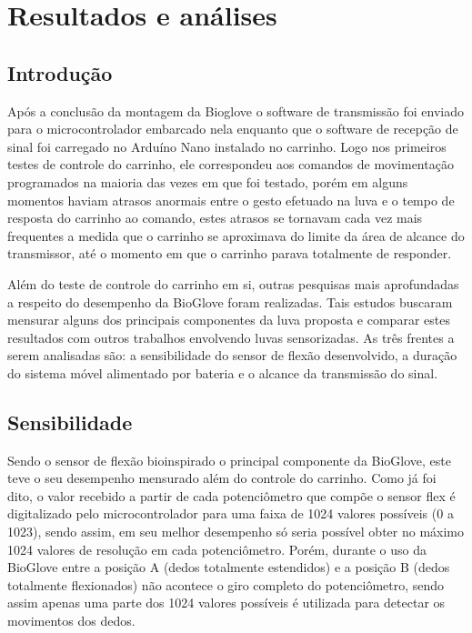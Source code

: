 \documentclass[
	12pt,				%
	openright,			%
	oneside,			%
	a4paper,			%
	english,			%
	brazil				%
	]{abntex2}
\begin{document}


\chapter{Resultados e análises}

		\section{Introdução}
		
		Após a conclusão da montagem da Bioglove o software de transmissão foi enviado para o microcontrolador embarcado nela enquanto que o software de recepção de sinal foi carregado no Arduíno Nano instalado no carrinho. Logo nos primeiros testes de controle do carrinho, ele correspondeu aos comandos de movimentação programados na maioria das vezes em que foi testado, porém em alguns momentos haviam atrasos anormais entre o gesto efetuado na luva e o tempo de resposta do carrinho ao comando, estes atrasos se tornavam cada vez mais frequentes a medida que o carrinho se aproximava do limite da área de alcance do transmissor, até o momento em que o carrinho parava totalmente de responder.

		Além do teste de controle do carrinho em si, outras pesquisas mais aprofundadas a respeito do desempenho da BioGlove foram realizadas. Tais estudos buscaram mensurar alguns dos principais componentes da luva proposta e comparar estes resultados com outros trabalhos envolvendo luvas sensorizadas. As três frentes a serem analisadas são: a sensibilidade do sensor de flexão desenvolvido, a duração do sistema móvel alimentado por bateria e o alcance da transmissão do sinal.
		

		\section{Sensibilidade}

		Sendo o sensor de flexão bioinspirado o principal componente da BioGlove, este teve o seu desempenho mensurado além do controle do carrinho. Como já foi dito, o valor recebido a partir de cada potenciômetro que compõe o sensor flex é digitalizado pelo microcontrolador para uma faixa de 1024 valores possíveis (0 a 1023), sendo assim, em seu melhor desempenho só seria possível obter no máximo 1024 valores de resolução em cada potenciômetro. Porém, durante o uso da BioGlove entre a posição A (dedos totalmente estendidos) e a posição B (dedos totalmente flexionados) não acontece o giro completo do potenciômetro, sendo assim apenas uma parte dos 1024 valores possíveis é utilizada para detectar os movimentos dos dedos.
		
\end{document}
